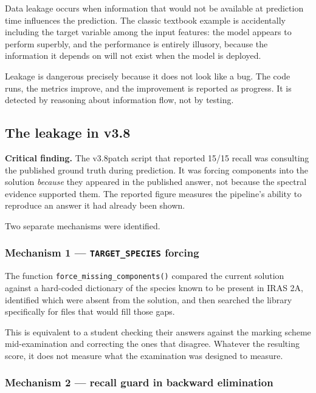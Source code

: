 \documentclass[11pt,a4paper]{article}
\newcommand{\code}[1]{\texttt{\small #1}}
\begin{document}
Data leakage occurs when information that would not be available at
prediction time influences the prediction. The classic textbook example is
accidentally including the target variable among the input features: the
model appears to perform superbly, and the performance is entirely
illusory, because the information it depends on will not exist when the
model is deployed.

Leakage is dangerous precisely because it does not look like a bug. The
code runs, the metrics improve, and the improvement is reported as
progress. It is detected by reasoning about information flow, not by
testing.

\subsection{The leakage in v3.8}

\begin{warnbox}
\textbf{Critical finding.} The v3.8patch script that reported 15/15 recall
was consulting the published ground truth during prediction. It was
forcing components into the solution \emph{because} they appeared in the
published answer, not because the spectral evidence supported them. The
reported figure measures the pipeline's ability to reproduce an answer it
had already been shown.
\end{warnbox}

Two separate mechanisms were identified.

\subsubsection*{Mechanism 1 --- \code{TARGET\_SPECIES} forcing}

The function \code{force\_missing\_components()} compared the current
solution against a hard-coded dictionary of the species known to be present
in IRAS 2A, identified which were absent from the solution, and then
searched the library specifically for files that would fill those gaps.

This is equivalent to a student checking their answers against the marking
scheme mid-examination and correcting the ones that disagree. Whatever the
resulting score, it does not measure what the examination was designed to
measure.

\subsubsection*{Mechanism 2 --- recall guard in backward elimination}
\end{document}
